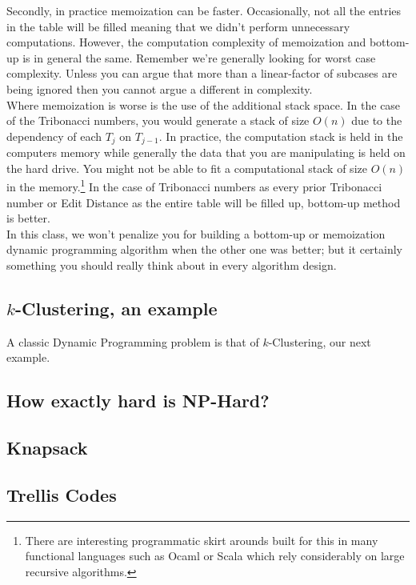 \documentclass[10pt]{article}
\theoremstyle{plain}
\theoremstyle{definition}
\numberwithin{equation}{section}
\numberwithin{figure}{section}
\begin{document}
\noindent Secondly, in practice memoization can be faster. Occasionally, not all the entries in the table will be filled meaning that we didn't perform unnecessary computations. However, the computation complexity of memoization and bottom-up is in general the same. Remember we're generally looking for worst case complexity. Unless you can argue that more than a linear-factor of subcases are being ignored then you cannot argue a different in complexity. \\

\noindent Where memoization is worse is the use of the additional stack space. In the case of the Tribonacci numbers, you would generate a stack of size $O(n)$ due to the dependency of each $T_j$ on $T_{j-1}$. In practice, the computation stack is held in the computers memory while generally the data that you are manipulating is held on the hard drive. You might not be able to fit a computational stack of size $O(n)$ in the memory.\footnote{There are interesting programmatic skirt arounds built for this in many functional languages such as Ocaml or Scala which rely considerably on large recursive algorithms.} In the case of Tribonacci numbers as every prior Tribonacci number or Edit Distance as the entire table will be filled up, bottom-up method is better. \\

\noindent In this class, we won't penalize you for building a bottom-up or memoization dynamic programming algorithm when the other one was better; but it certainly something you should really think about in every algorithm design.

\subsection{$k$-Clustering, an example}
A classic Dynamic Programming problem is that of $k$-Clustering, our next example.

\subsection{How exactly hard is NP-Hard?}

\subsection{Knapsack}

\subsection{Trellis Codes}
\end{document}
